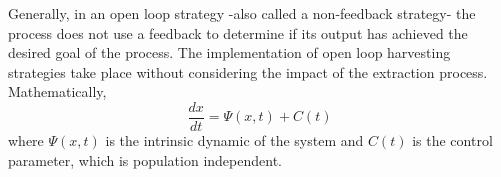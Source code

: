 Generally, in an open loop strategy -also called a non-feedback strategy- the process does not use a feedback to determine if its output has achieved the desired goal of the process. The implementation of open loop harvesting strategies take place without considering the impact of the extraction process. Mathematically,
\begin{equation}
\frac{dx}{dt}=\Psi(x,t)+C(t)
\end{equation}
where $\Psi(x,t)$ is the intrinsic dynamic of the system and $C(t)$ is the control parameter, which is population independent.